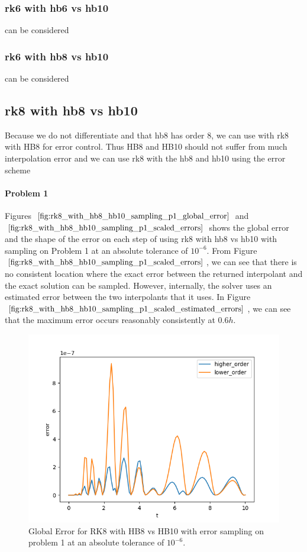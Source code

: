 \subsubsection{rk6 with hb6 vs hb10}
can be considered
\subsubsection{rk6 with hb8 vs hb10}
can be considered

\subsection{rk8 with hb8 vs hb10}
Because we do not differentiate and that hb8 has order 8, we can use with rk8 with HB8 for error control. Thus HB8 and HB10 should not suffer from much interpolation error and we can use rk8 with the hb8 and hb10 using the error scheme

\paragraph{Problem 1} Figures $\ref{fig:rk8_with_hb8_hb10_sampling_p1_global_error}$ and $\ref{fig:rk8_with_hb8_hb10_sampling_p1_scaled_errors}$ shows the global error and the shape of the error on each step of using rk8 with hb8 vs hb10 with sampling on Problem 1 at an absolute tolerance of $10^{-6}$. From Figure $\ref{fig:rk8_with_hb8_hb10_sampling_p1_scaled_errors}$, we can see that there is no consistent location where the exact error between the returned interpolant and the exact solution can be sampled. However, internally, the solver uses an estimated error between the two interpolants that it uses. In Figure $\ref{fig:rk8_with_hb8_hb10_sampling_p1_scaled_estimated_errors}$, we can see that the maximum error occurs reasonably consistently at $0.6h$.

\begin{figure}[H]
\centering
\includegraphics[width=0.7\linewidth]{./figures/rk8_with_hb8_hb10_sampling_p1_global_error}
\caption{Global Error for RK8 with HB8 vs HB10 with error sampling on problem 1 at an absolute tolerance of $10^{-6}$.}
\label{fig:rk8_with_hb8_hb10_sampling_p1_global_error}
\end{figure}

